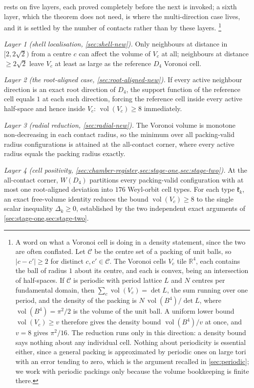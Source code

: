 \documentclass[11pt,reqno]{amsart}
\renewcommand{\_}{\origunderscore\allowbreak}
\numberwithin{equation}{section}
\theoremstyle{plain}
\theoremstyle{definition}
\theoremstyle{remark}
\newcommand{\Cell}[1]{\mathfrak{k}_{#1}}     %
\newcommand{\defect}{\Delta}                 %
\DeclareMathOperator{\vol}{vol}
\begin{document}
 rests on five layers, each proved completely
before the next is invoked; a sixth layer, which the theorem does not
need, is where the multi-direction case lives, and it is settled by the
number of contacts rather than by these layers.%
\footnote{A word on what a Voronoi cell is doing in a density
  statement, since the two are often conflated. Let $\mathcal{C}$ be the
  centre set of a packing of unit balls, so $|c-c'|\ge2$ for distinct
  $c,c'\in\mathcal{C}$. The Voronoi cells $V_c$ tile $\mathbb{R}^4$, each
  contains the ball of radius $1$ about its centre, and each is convex,
  being an intersection of half-spaces. If $\mathcal{C}$ is periodic with
  period lattice $L$ and $N$ centres per fundamental domain, then
  $\sum_{c} \vol(V_c) = \det L$, the sum running over one period, and the
  density of the packing is $N\,\vol(B^4)/\det L$, where
  $\vol(B^4)=\pi^2/2$ is the volume of the unit ball. A uniform lower
  bound $\vol(V_c)\ge v$ therefore gives the density bound
  $\vol(B^4)/v$ at once, and $v=8$ gives $\pi^2/16$. The reduction runs
  only in this direction: a density bound says nothing about any
  individual cell. Nothing about periodicity is essential either, since
  a general packing is approximated by periodic ones on large tori with
  an error tending to zero, which is the argument recalled in
  \cref{sec:periodic}; we work with periodic packings only because the
  volume bookkeeping is finite there.}

\smallskip\noindent\textit{Layer 1 (shell localisation, \cref{sec:shell-new}).}
Only neighbours at distance in $[2,2\sqrt2)$ from a centre $c$ can
affect the volume of $V_c$ at all; neighbours at distance $\ge2\sqrt2$
leave $V_c$ at least as large as the reference $D_4$ Voronoi cell.

\smallskip\noindent\textit{Layer 2 (the root-aligned case, \cref{sec:root-aligned-new}).}
If every active neighbour direction is an exact root direction of
$D_4$, the support function of the reference cell equals $1$ at each
such direction, forcing the reference cell inside every active
half-space and hence inside $V_c$: $\vol(V_c)\ge8$ immediately.

\smallskip\noindent\textit{Layer 3 (radial reduction, \cref{sec:radial-new}).}
The Voronoi volume is monotone non-decreasing in each contact radius,
so the minimum over all packing-valid radius configurations is attained
at the all-contact corner, where every active radius equals the
packing radius exactly.

\smallskip\noindent\textit{Layer 4 (cell positivity, \cref{sec:chamber-register,sec:stage-one,sec:stage-two}).}
At the all-contact corner, $W(D_4)$ partitions every packing-valid
configuration with at most one root-aligned deviation into $176$
Weyl-orbit cell types. For each type $\Cell{k}$, an exact free-volume
identity reduces the bound $\vol(V_c)\ge8$ to the single scalar
inequality $\defect_k\ge0$, established by the two independent exact
arguments of \cref{sec:stage-one,sec:stage-two}.
\end{document}
